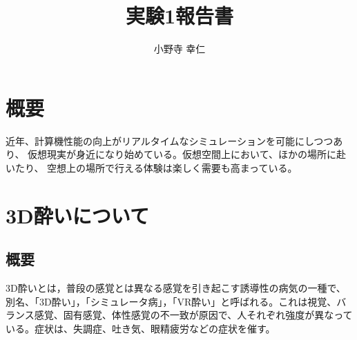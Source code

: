 \documentclass{jsarticle}
\title{実験1報告書}
\author{小野寺 幸仁}
\date{}
\begin{document}
\maketitle
\clearpage

\section{概要}
近年、計算機性能の向上がリアルタイムなシミュレーションを可能にしつつあり、
仮想現実が身近になり始めている。仮想空間上において、ほかの場所に赴いたり、
空想上の場所で行える体験は楽しく需要も高まっている。

\section{3D酔いについて}

\subsection{概要}
3D酔いとは，普段の感覚とは異なる感覚を引き起こす誘導性の病気の一種で、
別名、「3D酔い」，「シミュレータ病」，「VR酔い」と呼ばれる。これは視覚、バランス感覚、固有感覚、体性感覚の不一致が原因で、人それぞれ強度が異なっている。症状は、失調症、吐き気、眼精疲労などの症状を催す。
\end{document}
